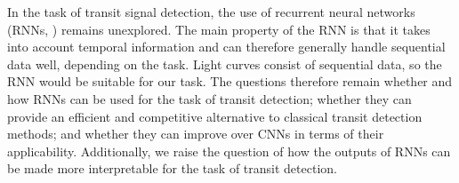 In the task of transit signal detection, the use of recurrent neural networks (RNNs, \citealp{hochreiter1997long,cho2014learning}) remains unexplored. The main property of the RNN is that it takes into account temporal information and can therefore generally handle sequential data well, depending on the task. Light curves consist of sequential data, so the RNN would be suitable for our task. The questions therefore remain whether and how RNNs can be used for the task of transit detection; whether they can provide an efficient and competitive alternative to classical transit detection methods; and whether they can improve over CNNs in terms of their applicability. Additionally, we raise the question of how the outputs of RNNs can be made more interpretable for the task of transit detection. 


